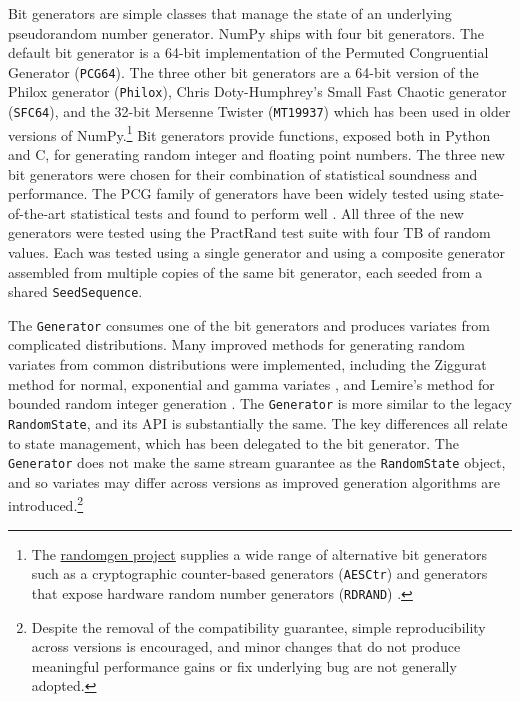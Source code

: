 \documentclass{article}
\begin{document}
Bit generators are simple classes that manage the state of an underlying
pseudorandom number generator. NumPy ships with four bit generators. The default
bit generator is a 64-bit implementation of the Permuted Congruential Generator
\cite{pcg64} (\texttt{PCG64}). The three other bit generators are a 64-bit version
of the Philox generator \cite{random123} (\texttt{Philox}), Chris Doty-Humphrey's
Small Fast Chaotic generator \cite{practrand} (\texttt{SFC64}), and the 32-bit
Mersenne Twister \cite{mt19937} (\texttt{MT19937}) which has been used in older
versions of NumPy.\footnote{The
\href{https://github.com/bashtage/randomgen}{randomgen project} supplies a wide
range of alternative bit generators such as a cryptographic counter-based
generators (\texttt{AESCtr}) and generators that expose hardware random number
generators (\texttt{RDRAND}) \cite{randomgen}.} Bit generators provide
functions, exposed both in Python and C, for generating random integer
and floating point numbers. The three new bit generators were chosen for their
combination of statistical soundness and performance. The PCG family of generators
have been widely tested using state-of-the-art statistical tests and found to
perform well \cite{lemire_blog}. All three of the new generators were tested
using the PractRand test suite \cite{practrand} with four TB of random values.
Each was tested using a single generator and using a composite generator assembled
from multiple copies of the same bit generator, each seeded from a shared
\texttt{SeedSequence}.

The \texttt{Generator} consumes one of the bit generators and produces variates
from complicated distributions. Many improved methods for generating random
variates from common distributions were implemented, including the Ziggurat
method for normal, exponential and gamma variates \cite{ziggurat}, and Lemire's
method for bounded random integer generation \cite{lemire}. The \texttt{Generator}
is more similar to the legacy \texttt{RandomState}, and its API is substantially
the same. The key differences all relate to state management, which has been
delegated to the bit generator. The \texttt{Generator} does not make the same
stream guarantee as the \texttt{RandomState} object, and so variates may differ
across versions as improved generation algorithms are
introduced.\footnote{Despite the removal of the compatibility guarantee, simple
reproducibility across versions is encouraged, and minor changes that do not
produce meaningful performance gains or fix underlying bug are not generally
adopted.}
\end{document}
